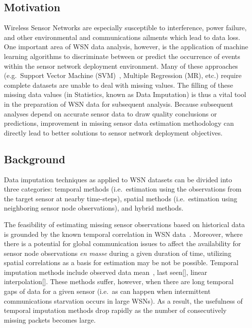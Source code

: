 \subsection{Motivation }
Wireless Sensor Networks are especially susceptible to interference, power failure, and other environmental and communications ailments which lead to data loss.
One important area of WSN data analysis, however, is the application of machine learning algorithms to discriminate between or predict the occurrence of events within the sensor network deployment environment.
Many of these approaches (e.g.\ Support Vector Machine (SVM)~\cite{vapnik2000nature}, Multiple Regression (MR), etc.) require complete datasets are unable to deal with missing values.
The filling of these missing data values (in Statistics, known as Data Imputation) is thus a vital tool in the preparation of WSN data for subsequent analysis. 
Because subsequent analyses depend on accurate sensor data to draw quality conclusions or predictions, improvement in missing sensor data estimation methodology can directly lead to better solutions to sensor network deployment objectives.

\subsection{Background }
Data imputation techniques as applied to WSN datasets can be divided into three categories:
temporal methods (i.e.\ estimation using the observations from the target sensor at nearby time-steps), 
spatial methods (i.e.\ estimation using neighboring sensor node observations), 
and hybrid methods.

The feasibility of estimating missing sensor observations based on historical data is grounded by the known temporal correlation in WSN data~\cite{akyildiz2004exploiting}.
Moreover, where there is a potential for global communication issues to affect the availability for sensor node observations \emph{en masse} during a given duration of time, utilizing spatial correlations as a basis for estimation may be not be possible.
Temporal imputation methods include observed data mean~\cite{madden2005tinydb,setz2009combining}, last seen[], linear interpolation[].
These methods suffer, however, when there are long temporal gaps of data for a given sensor (i.e.\ as can happen when intermittent communications starvation occurs in large WSNs).
As a result, the usefulness of temporal imputation methods drop rapidly as the number of consecutively missing packets becomes large.

